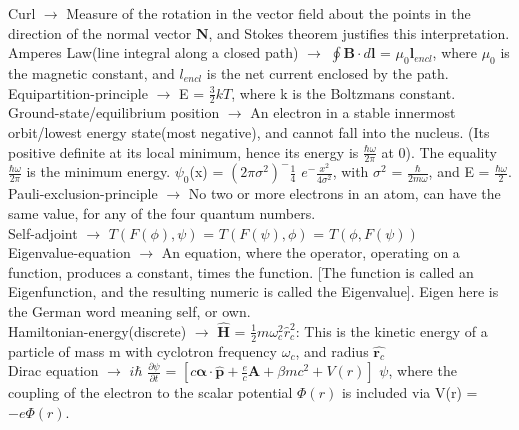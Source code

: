 \documentclass[10pt,fancy]{elegantbook}
\begin{document}
{\begin{definition}
Curl $\longrightarrow$ Measure of the rotation in the vector field about the points in the direction of the normal vector $\mathbf N$, and Stokes theorem justifies this interpretation. \\
 
Amperes Law(line integral along a closed path) $\longrightarrow$ $\oint \mathbf B \cdot d \mathbf l$ = $\mu_0 \mathbf l_{encl}$, 
where $\mu_0$ is the magnetic constant, and $l_{encl}$ is the net current enclosed by the path.  \\
  
Equipartition-principle $\longrightarrow$ E = $\frac{3}{2}kT$, where k is the Boltzmans constant. \\
 
Ground-state/equilibrium position $\longrightarrow$ An electron in a stable innermost orbit/lowest energy state(most negative), and cannot fall into the nucleus.
(Its positive definite at its local minimum, hence its energy is $\frac{\hbar \omega}{2 \pi}$ at 0). The equality $\frac{\hbar \omega}{2 \pi}$ is the minimum energy. $\psi_0$(x) = $(2 \pi \sigma^2)^- \frac{1}{4}$ $e^- \frac{x^2}{4 \sigma^2}$, with $\sigma^2$ = $\frac{\hbar}{2m \omega}$, and E = $\frac{\hbar \omega}{2}$. \\
 
Pauli-exclusion-principle $\longrightarrow$ No two or more electrons in an atom, can have the same value, for any of the four quantum numbers. \\
 
Self-adjoint $\longrightarrow$ $T(F(\phi), \psi)$ = $T(F(\psi), \phi)$ = $T(\phi, F(\psi))$  \\
 
Eigenvalue-equation $\longrightarrow$ An equation, where the operator, operating on a function, produces a constant, times the function. [The function is called 
an Eigenfunction, and the resulting numeric is called the Eigenvalue]. Eigen here is the German word meaning self, or own.  \\
               
Hamiltonian-energy(discrete) $\longrightarrow$ $\hat {\mathbf H}$ = $\frac{1}{2} m \omega^2_c \hat {r}^2_c$: This is the kinetic energy of 
a particle of mass m with cyclotron frequency $\omega_c$, and radius $\hat {\mathbf {r}_c}$ \\
 
Dirac equation $\longrightarrow$ $i \hbar$ $\frac{\partial \psi}{\partial t}$ = $ \left[ c {\mathbf \alpha} \cdot \hat {\mathbf p} + \frac{e}{c} {\mathbf A} + {\beta m} {c^2} + V(r) \right]$ $\psi$,
where the coupling of the electron to the scalar potential $\Phi(r)$ is included via V(r) = ${- e \Phi(r)}$.  \


\end{definition}}
\end{document}
